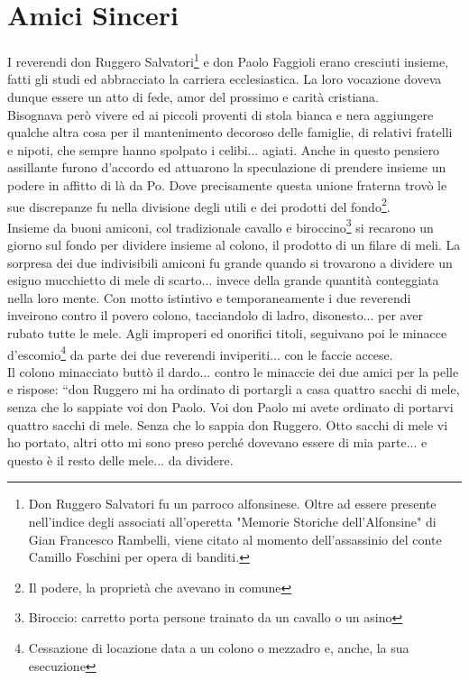 \documentclass[10pt]{memoir} %
\begin{document}
\chapter{Amici Sinceri}
I reverendi don Ruggero Salvatori\footnote{Don Ruggero Salvatori fu un parroco alfonsinese. Oltre ad essere presente nell'indice degli associati all'operetta "Memorie Storiche dell'Alfonsine" di Gian Francesco Rambelli, viene citato al momento dell'assassinio del conte Camillo Foschini per opera di banditi.} e don Paolo Faggioli erano cresciuti insieme, fatti gli studi ed abbracciato la carriera ecclesiastica. La loro vocazione doveva dunque essere un atto di fede, amor del prossimo e carità cristiana.\\
Bisognava però vivere ed ai piccoli proventi di stola bianca e nera aggiungere qualche altra cosa per il mantenimento decoroso delle famiglie, di relativi fratelli e nipoti, che sempre hanno spolpato i celibi... agiati. Anche in questo pensiero assillante furono d'accordo ed attuarono la speculazione di prendere insieme un podere in affitto di là da Po. Dove precisamente questa unione fraterna trovò le sue discrepanze fu nella divisione degli utili e dei prodotti del fondo\footnote{Il podere, la proprietà che avevano in comune}. \\
Insieme da buoni amiconi, col tradizionale cavallo e biroccino\footnote{Biroccio: carretto porta persone trainato da un cavallo o un asino} si recarono un giorno sul fondo per dividere insieme al colono, il prodotto di un filare di meli. La sorpresa dei due indivisibili amiconi fu grande quando si trovarono a dividere un esiguo mucchietto di mele di scarto... invece della grande quantità conteggiata nella loro mente. Con motto istintivo e temporaneamente i due reverendi inveirono contro il povero colono, tacciandolo di ladro, disonesto... per aver rubato tutte le mele. Agli improperi ed onorifici titoli, seguivano poi le minacce d’escomio\footnote{Cessazione di locazione data a un colono o mezzadro e, anche, la sua esecuzione} da parte dei due reverendi inviperiti... con le faccie accese.\\
Il colono minacciato buttò il dardo... contro le minaccie dei due amici per la pelle e rispose: “don Ruggero mi ha ordinato di portargli a casa quattro sacchi di mele, senza che lo sappiate voi don Paolo. Voi don Paolo mi avete ordinato di portarvi quattro sacchi di mele. Senza che lo sappia don Ruggero. Otto sacchi di mele vi ho portato, altri otto mi sono preso perché dovevano essere di mia parte... e questo è il resto delle mele... da dividere. 
\end{document}
